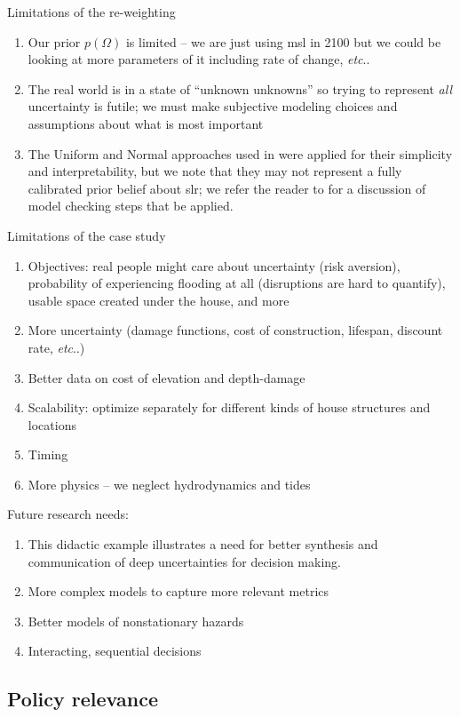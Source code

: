 \documentclass[11pt]{article}
\makeatletter
\DeclareRobustCommand\onedot{\futurelet\@let@token\@onedot}
\def\@onedot{\ifx\@let@token.\else.\null\fi\xspace}
\def\etc{\emph{etc}\onedot} \def\vs{\emph{vs}\onedot}
\DeclareRobustCommand\onedot{\futurelet\@let@token\@onedot}
\def\@onedot{\ifx\@let@token.\else.\null\fi\xspace}
\def\etc{\emph{etc}\onedot} \def\vs{\emph{vs}\onedot}
\makeatother
\begin{document}
Limitations of the re-weighting
\begin{enumerate}
    \item Our prior $p(\Omega)$ is limited -- we are just using \gls{msl} in 2100 but we could be looking at more parameters of it including rate of change, \etc
    \item The real world is in a state of ``unknown unknowns'' \citep[level 5 as defined in][fig.~1]{walker_deep:2013} so trying to represent \emph{all} uncertainty is futile; we must make subjective modeling choices and assumptions about what is most important
    \item The Uniform and Normal approaches used in \citet{fuller_inversion:2017} were applied for their simplicity and interpretability, but we note that they may not represent a fully calibrated prior belief about \gls{slr}; we refer the reader to \citet{gelman_workflow:2020} for a discussion of model checking steps that be applied.
\end{enumerate}
Limitations of the case study
\begin{enumerate}
    \item Objectives: real people might care about uncertainty (risk aversion), probability of experiencing flooding at all (disruptions are hard to quantify), usable space created under the house, and more
    \item More uncertainty (damage functions, cost of construction, lifespan, discount rate, \etc)
    \item Better data on cost of elevation and depth-damage
    \item Scalability: optimize separately for different kinds of house structures and locations
    \item Timing
    \item More physics -- we neglect hydrodynamics and tides
\end{enumerate}
Future research needs:
\begin{enumerate}
    \item This didactic example illustrates a need for better synthesis and communication of deep uncertainties for decision making.
    \item More complex models to capture more relevant metrics
    \item Better models of nonstationary hazards
    \item Interacting, sequential decisions
\end{enumerate}

\subsection{Policy relevance}
\end{document}
